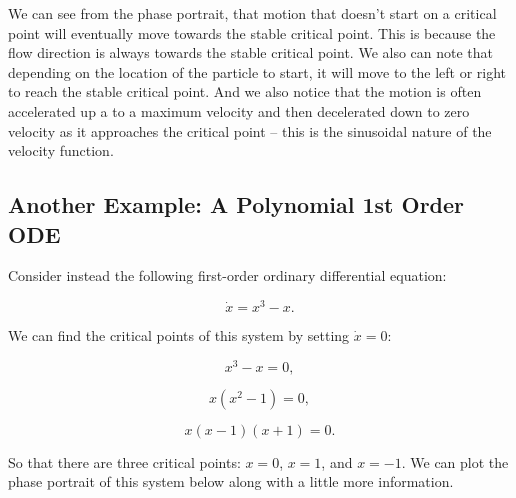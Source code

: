 \documentclass[11pt]{article}
\begin{document}
We can see from the phase portrait, that motion that doesn't start on a
critical point will eventually move towards the stable critical point.
This is because the flow direction is always towards the stable critical
point. We also can note that depending on the location of the particle
to start, it will move to the left or right to reach the stable critical
point. And we also notice that the motion is often accelerated up a to a
maximum velocity and then decelerated down to zero velocity as it
approaches the critical point -- this is the sinusoidal nature of the
velocity function.

    \subsection{Another Example: A Polynomial 1st Order
ODE}\label{another-example-a-polynomial-1st-order-ode}

Consider instead the following first-order ordinary differential
equation:

\[\dot{x} = x^3 - x.\]

We can find the critical points of this system by setting
\(\dot{x} = 0\):

\[x^3 - x = 0,\]

\[x(x^2 - 1) = 0,\]

\[x(x-1)(x+1) = 0.\]

So that there are three critical points: \(x = 0\), \(x = 1\), and
\(x = -1\). We can plot the phase portrait of this system below along
with a little more information.
\end{document}
